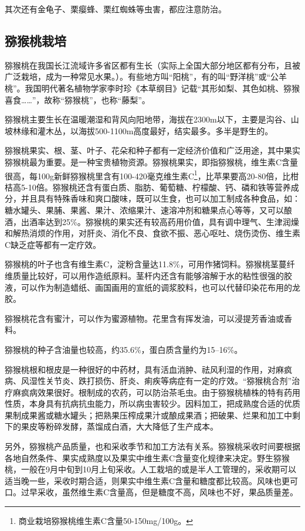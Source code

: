 \documentclass{ctexbook}
\begin{document}
其次还有金龟子、栗瘿蜂、栗红蜘蛛等虫害，都应注意防治。
\subsection{猕猴桃栽培}
猕猴桃在我国长江流域许多省区都有生长（实际上全国大部分地区都有分布，且被广泛栽培，成为一种常见水果。）。有些地方叫“阳桃”，有的叫“野洋桃”或“公羊桃”。我国明代著名植物学家李时珍《本草纲目》记载“其形如梨、其色如桃、猕猴喜食……”，故称“猕猴桃”，也称“藤梨”。

猕猴桃主要生长在温暖潮湿和背风向阳地带，海拔在2300m以下，主要是沟谷、山坡林缘和灌木丛，以海拔500-1100m高度最好，结实最多。多半是野生的。

猕猴桃果实、根、茎、叶子、花朵和种子都有一定经济价值和广泛用途，其中果实猕猴桃最为重要。是一种宝贵植物资源。猕猴桃果实，即指猕猴桃，维生素C含量很高，每100g新鲜猕猴桃里含有100-420毫克维生素C\footnote{商业栽培猕猴桃维生素C含量50-150mg/100g。}，比苹果要高20-80倍，比柑桔高5-10倍。猕猴桃还含有蛋白质、脂肪、葡萄糖、柠檬酸、钙、磷和铁等营养成分，并且具有特殊香味和爽口酸味，既可以生食，也可以加工制成各种食品，如：糖水罐头、果脯、果酱、果汁、浓缩果汁、速溶冲剂和糖果点心等等，又可以酿酒，出酒率达到25\%。猕猴桃的果实还有较高药用价值，具有调中理气、生津润燥和解热消烦的作用，对肝炎、消化不良、食欲不振、恶心呕吐、烧伤烫伤、维生素C缺乏症等都有一定疗效。

猕猴桃的叶子也含有维生素C，淀粉含量达11.8\%，可用作猪饲料。猕猴桃茎蔓纤维质量比较好，可以用作造纸原料。茎杆内还含有能够溶解于水的粘性很强的胶液，可以作为制造蜡纸、画国画用的宣纸的调浆胶料，也可以代替印染花布用的龙胶。

猕猴桃花含有蜜汁，可以作为蜜源植物。花里含有挥发油，可以浸提芳香油或香料。

猕猴桃的种子含油量也较高，约35.6\%，蛋白质含量约为15--16\%。

猕猴桃根和根皮是一种很好的中药材，具有活血消肿、祛风利湿的作用，对麻疯病、风湿性关节炎、跌打损伤、肝炎、痢疾等病症有一定的疗效。“猕猴桃合剂”治疗麻疯病效果很好。根制成的农药，可以防治茶毛虫。由于猕猴桃植株的特有药用性质，本身具有抗病抗虫能力，所以病虫害较少。因料加工，把成熟度合适的优质果制成果酱或糖水罐头；把熟果压榨成果汁或酿成果酒；把破果、烂果和加工中剩下的果皮等粉碎发酵，蒸馏成白酒，大大降低了生产成本。

另外，猕猴桃产品质量，也和采收季节和加工方法有关系。猕猴桃采收时间要根据各地自然条件、果实成熟度以及果实中维生素C含量变化规律来决定。野生猕猴桃，一般在9月中旬到10月上旬采收。人工栽培的或是半人工管理的，采收期可以适当晚一些，采收时期合适，则果实中维生素C含量和糖度都比较高。风味也更可口。过早采收，虽然维生素C含量高，但是糖度不高，风味也不好，果品质量差。
\end{document}
